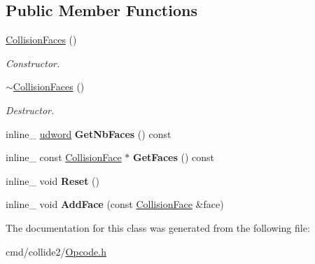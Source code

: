 \subsection*{Public Member Functions}
\begin{DoxyCompactItemize}
\item 
\hyperlink{classOpcode_1_1CollisionFaces_a5132ad48f93a547570f75a2b1bd9914a}{Collision\+Faces} ()\hypertarget{classOpcode_1_1CollisionFaces_a5132ad48f93a547570f75a2b1bd9914a}{}\label{classOpcode_1_1CollisionFaces_a5132ad48f93a547570f75a2b1bd9914a}

\begin{DoxyCompactList}\small\item\em Constructor. \end{DoxyCompactList}\item 
\hyperlink{classOpcode_1_1CollisionFaces_af61c7a76b8b9047933ce00946e5b3ebd}{$\sim$\+Collision\+Faces} ()\hypertarget{classOpcode_1_1CollisionFaces_af61c7a76b8b9047933ce00946e5b3ebd}{}\label{classOpcode_1_1CollisionFaces_af61c7a76b8b9047933ce00946e5b3ebd}

\begin{DoxyCompactList}\small\item\em Destructor. \end{DoxyCompactList}\item 
inline\+\_\+ \hyperlink{IceTypes_8h_a44c6f1920ba5551225fb534f9d1a1733}{udword} {\bfseries Get\+Nb\+Faces} () const \hypertarget{classOpcode_1_1CollisionFaces_a4769192f7145fd028de11c52968f2cf4}{}\label{classOpcode_1_1CollisionFaces_a4769192f7145fd028de11c52968f2cf4}

\item 
inline\+\_\+ const \hyperlink{classOpcode_1_1CollisionFace}{Collision\+Face} $\ast$ {\bfseries Get\+Faces} () const \hypertarget{classOpcode_1_1CollisionFaces_a104da499ad40edc9da5734dfd58e9bc4}{}\label{classOpcode_1_1CollisionFaces_a104da499ad40edc9da5734dfd58e9bc4}

\item 
inline\+\_\+ void {\bfseries Reset} ()\hypertarget{classOpcode_1_1CollisionFaces_a84fba8964eaca93f23475fb58ca07a09}{}\label{classOpcode_1_1CollisionFaces_a84fba8964eaca93f23475fb58ca07a09}

\item 
inline\+\_\+ void {\bfseries Add\+Face} (const \hyperlink{classOpcode_1_1CollisionFace}{Collision\+Face} \&face)\hypertarget{classOpcode_1_1CollisionFaces_ad443b77d902ee08a31bc94161af01da8}{}\label{classOpcode_1_1CollisionFaces_ad443b77d902ee08a31bc94161af01da8}

\end{DoxyCompactItemize}


The documentation for this class was generated from the following file\+:\begin{DoxyCompactItemize}
\item 
cmd/collide2/\hyperlink{Opcode_8h}{Opcode.\+h}\end{DoxyCompactItemize}
